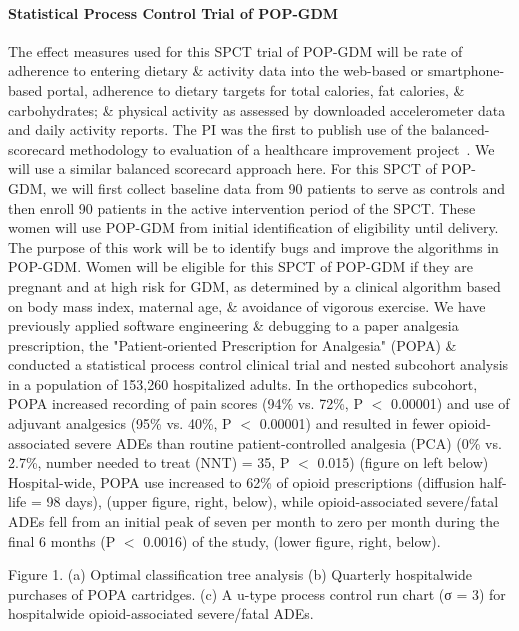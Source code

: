 \paragraph{Statistical Process Control Trial of POP-GDM }
The effect measures used
for this SPCT trial of POP-GDM will be rate of adherence to entering
dietary \& activity data into the web-based or smartphone-based
portal, adherence to dietary targets for total calories, fat calories,
\& carbohydrates; \& physical activity as assessed by downloaded
accelerometer data and daily activity reports. The PI was the first to
publish use of the balanced-scorecard methodology to evaluation of a
healthcare improvement project~\citep{Graumlich,Belknap2001}. We will use
a similar balanced scorecard approach here. For this SPCT of POP-GDM,
we will first collect baseline data from 90 patients to serve as controls and then enroll
90 patients in the active intervention period of the SPCT. These women will use POP-GDM from initial identification of eligibility until
delivery. The purpose of this work will be to
identify bugs and improve the algorithms in POP-GDM. Women
will be eligible for this SPCT of POP-GDM if they are pregnant and at
high risk for GDM, as determined by a clinical algorithm based on body
mass index, maternal age, \& avoidance of vigorous exercise. We have
previously applied software engineering \& debugging to a paper
analgesia prescription, the "Patient-oriented Prescription for
Analgesia" (POPA) \& conducted a statistical process control clinical
trial and nested subcohort analysis in a population of 153,260
hospitalized adults. In the orthopedics subcohort, POPA increased
recording of pain scores (94\% vs. 72\%, P $<$ 0.00001) and use of
adjuvant analgesics (95\% vs. 40\%, P $<$ 0.00001) and resulted in
fewer opioid-associated severe ADEs than routine patient-controlled
analgesia (PCA) (0\% vs. 2.7\%, number needed to treat (NNT) = 35, P
$<$ 0.015) (figure on left below) Hospital-wide, POPA use increased to
62\% of opioid prescriptions (diffusion half-life = 98 days), (upper
figure, right, below), while opioid-associated severe/fatal ADEs fell
from an initial peak of seven per month to zero per month during the
final 6 months (P $<$ 0.0016) of the study, (lower figure, right,
below).

 

Figure 1. (a) Optimal classification tree analysis (b) Quarterly hospitalwide purchases of POPA cartridges. (c) A u-type process control run chart (σ = 3) for hospitalwide opioid-associated severe/fatal ADEs. 

